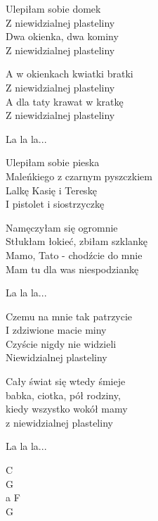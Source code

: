 \begin{text}
    Ulepiłam sobie domek\\
    Z niewidzialnej plasteliny\\
    Dwa okienka, dwa kominy\\
    Z niewidzialnej plasteliny

    A w okienkach kwiatki bratki\\
    Z niewidzialnej plasteliny\\
    A dla taty krawat w kratkę\\
    Z niewidzialnej plasteliny

    \vin  La la la...

    Ulepiłam sobie pieska\\
    Maleńkiego z czarnym pyszczkiem\\
    Lalkę Kasię i Tereskę\\
    I pistolet i siostrzyczkę
    
    Namęczyłam się ogromnie\\
    Stłukłam łokieć, zbiłam szklankę\\
    Mamo, Tato - chodźcie do mnie\\
    Mam tu dla was niespodziankę

    \vin La la la...

    Czemu na mnie tak patrzycie\\
    I zdziwione macie miny\\
    Czyście nigdy nie widzieli\\
    Niewidzialnej plasteliny

    Cały świat się wtedy śmieje\\
    babka, ciotka, pół rodziny,\\
    kiedy wszystko wokół mamy\\
    z niewidzialnej plasteliny

    \vin La la la...
\end{text}
\begin{chord}
    C\\
    G\\
    a F\\
    G
\end{chord}